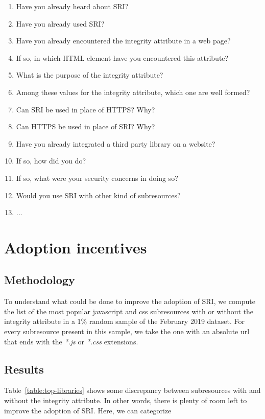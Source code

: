 \documentclass[sigconf,table]{acmart}
\begin{document}
\begin{enumerate}
	\item Have you already heard about SRI?
	\item Have you already used SRI?
	\item Have you already encountered the integrity attribute in a web page?
	\item If so, in which HTML element have you encountered this attribute?
	\item What is the purpose of the integrity attribute?
	\item Among these values for the integrity attribute, which one are well formed?
	\item Can SRI be used in place of HTTPS? Why?
	\item Can HTTPS be used in place of SRI? Why?
	\item Have you already integrated a third party library on a website?
	\item If so, how did you do?
	\item If so, what were your security concerns in doing so?
	\item Would you use SRI with other kind of subresources?
	\item ...
\end{enumerate}





\section{Adoption incentives} \label{sec:discussion}

\subsection{Methodology}

To understand what could be done to improve the adoption of SRI, we compute the list of the most popular javascript and css subresources with or without the integrity attribute in a \num{1}\% random sample of the February 2019 \CC dataset.
For every subresource present in this sample, we take the one with an absolute url that ends with the \textit{*.js} or \textit{*.css} extensions.

\subsection{Results}

Table~\ref{table:top-libraries} shows some discrepancy between subresources with and without the integrity attribute.
In other words, there is plenty of room left to improve the adoption of SRI.
Here, we can categorize 
\end{document}
